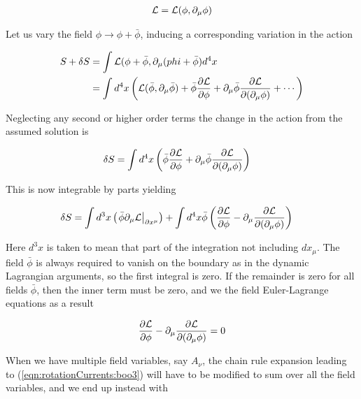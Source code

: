 \begin{align}\label{eqn:rotationCurrents:boo2}
\mathcal{L} = \mathcal{L}(\phi, \partial_\mu \phi)
\end{align}

Let us vary the field $\phi \rightarrow \phi + \bar{\phi}$, inducing a corresponding variation in the action

\begin{align*}
S + \delta S
&= \int \mathcal{L}(\phi + \bar{\phi}, \partial_\mu (phi + \bar{\phi}) d^4 x \\
&= \int d^4 x \left(
\mathcal{L}(\bar{\phi}, \partial_\mu \bar{\phi})
+
\bar{\phi} \frac{\partial {\mathcal{L}}}{\partial {\phi}}
+\partial_\mu \bar{\phi} \frac{\partial {\mathcal{L}}}{\partial {(\partial_\mu \phi)}}
+ \cdots \right)
\end{align*}

Neglecting any second or higher order terms the change in the action from the assumed solution is

\begin{align}\label{eqn:rotationCurrents:boo3}
\delta S
&=
\int d^4 x \left( \bar{\phi} \frac{\partial {\mathcal{L}}}{\partial {\phi}} +\partial_\mu \bar{\phi} \frac{\partial {\mathcal{L}}}{\partial {(\partial_\mu \phi)}} \right)
\end{align}

This is now integrable by parts yielding

\begin{align}\label{eqn:rotationCurrents:boo4}
\delta S
&=
\int d^3 x \left( {\left. \bar{\phi} \partial_\mu \mathcal{L} \right\vert}_{\partial x^\mu} \right)
+
\int d^4 x \bar{\phi} \left( \frac{\partial {\mathcal{L}}}{\partial {\phi}} - \partial_\mu \frac{\partial {\mathcal{L}}}{\partial {(\partial_\mu \phi)}} \right)
\end{align}

Here $d^3 x$ is taken to mean that part of the integration not including $dx_\mu$.  The field $\bar{\phi}$ is always required to vanish on the boundary as in the dynamic Lagrangian arguments, so the first integral is zero.  If the remainder is zero for all fields $\bar{\phi}$, then the inner term must be zero, and we the field Euler-Lagrange equations as a result

\begin{align}\label{eqn:rotationCurrents:boo5}
\frac{\partial {\mathcal{L}}}{\partial {\phi}} - \partial_\mu \frac{\partial {\mathcal{L}}}{\partial {(\partial_\mu \phi)}} = 0
\end{align}

When we have multiple field variables, say $A_\nu$, the chain rule expansion leading to (\ref{eqn:rotationCurrents:boo3}) will have to be modified to sum over all the field variables, and we end up instead with

